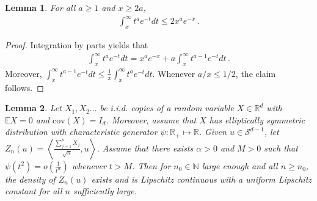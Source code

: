 \documentclass[12pt]{article}
\newcommand\cov{\mathrm{cov}}
\def\l{\left}
\def\r{\right}
\newcommand{\mb}{\mathbb}
\newcommand{\dotp}[2]{\left\langle#1,#2\right\rangle}
\newtheorem{lemma}{Lemma}
\theoremstyle{thmstyletwo}%
\theoremstyle{thmstylethree}%
\begin{document}
\begin{lemma}
\label{lemma:incomplete-gamma-bound}
    For all $a \geq 1$ and $x \geq 2a$,
    \begin{align*}
        \int_x^\infty t^ae^{-t} dt \leq 2x^ae^{-x}\,.
    \end{align*}
\end{lemma}

\begin{proof}
    Integration by parts yields that
    \begin{align*}
        \int_x^\infty t^ae^{-t} dt = x^ae^{-x} + a \int_x^\infty t^{a-1} e^{-t} dt\,.
    \end{align*}
    Moreover, $\int_x^\infty t^{a-1} e^{-t} dt \leq \frac{1}{x} \int_x^\infty t^a e^{-t} dt$. Whenever $a/x \leq 1/2$, the claim follows.
\end{proof}




\begin{lemma}\label{lemma:uniform-lipschitz}
    Let $X_1, X_2 \ldots$ be i.i.d. copies of a random variable $X \in \mb R^d$ with $\mb E X = 0$ and $\cov (X) = I_d$. Moreover, assume that $X$ has elliptically symmetric distribution with characteristic generator $\psi : \mb R_+ \mapsto \mb R$. Given $u \in \mathcal{S}^{d-1}$, let $Z_n(u) = \dotp{\frac{\sum_{j=1}^n X_j}{\sqrt{n}}}{u}$. Assume that there exists $\alpha > 0$ and $M > 0$ such that $\psi(t^2) = o\l(\frac{1}{t^\alpha}\r)$ whenever $t > M$. Then for $n_0 \in \mb N$ large enough and all $n \geq n_0$, the density of $Z_n(u)$ exists and is Lipschitz continuous with a uniform Lipschitz constant for all $n$ sufficiently large. 
\end{lemma}
\end{document}
